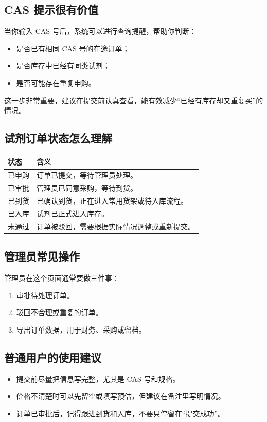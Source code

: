 \documentclass[12pt,a4paper]{ctexart}
\begin{document}
\subsection{CAS 提示很有价值}
当你输入 CAS 号后，系统可以进行查询提醒，帮助你判断：
\begin{itemize}
  \item 是否已有相同 CAS 号的在途订单；
  \item 是否库存中已经有同类试剂；
  \item 是否可能存在重复申购。
\end{itemize}

这一步非常重要，建议在提交前认真查看，能有效减少“已经有库存却又重复买”的情况。

\subsection{试剂订单状态怎么理解}
\begin{longtable}{p{3cm} p{10cm}}
\toprule
状态 & 含义 \\
\midrule
已申购 & 订单已提交，等待管理员处理。 \\
已审批 & 管理员已同意采购，等待到货。 \\
已到货 & 已确认到货，正在进入常用货架或待入库流程。 \\
已入库 & 试剂已正式进入库存。 \\
未通过 & 订单被驳回，需要根据实际情况调整或重新提交。 \\
\bottomrule
\end{longtable}

\subsection{管理员常见操作}
管理员在这个页面通常要做三件事：
\begin{enumerate}
  \item 审批待处理订单。
  \item 驳回不合理或重复的订单。
  \item 导出订单数据，用于财务、采购或留档。
\end{enumerate}

\subsection{普通用户的使用建议}
\begin{itemize}
  \item 提交前尽量把信息写完整，尤其是 CAS 号和规格。
  \item 价格不清楚时可以先留空或填写预估，但建议在备注里写明情况。
  \item 订单已审批后，记得跟进到货和入库，不要只停留在“提交成功”。
\end{itemize}
\end{document}
